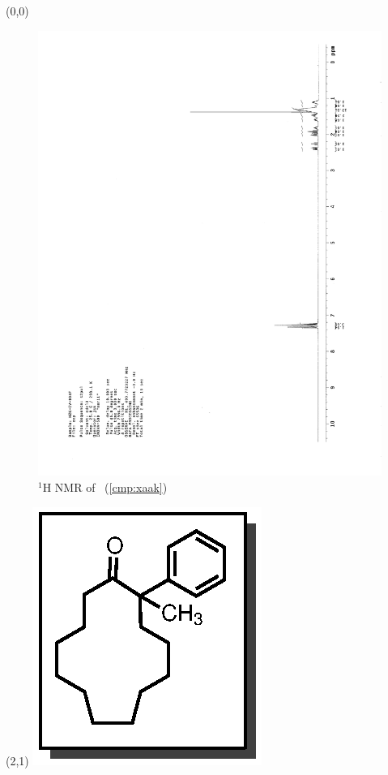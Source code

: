 \begin{textblock}{20}(0,0)
\begin{figure}[htb]
\caption{$^1$H NMR of \CMPxaak\ (\ref{cmp:xaak})}
\includegraphics[scale=0.75, trim = 0mm 0mm 0mm 5mm,
clip]{chp_asymmetric/images/nmr/xaakH}
\vspace{-100pt}
\end{figure}
\end{textblock}
\begin{textblock}{1}(2,1)
\includegraphics[scale=0.8, angle=90]{chp_asymmetric/images/xaak}
\end{textblock}

